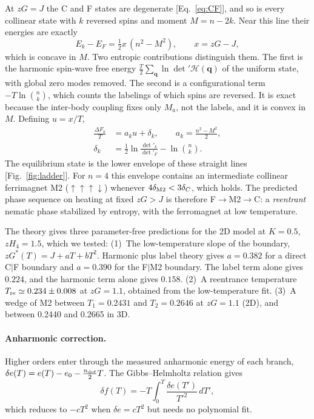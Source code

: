 \documentclass[pre,twocolumn,superscriptaddress,amsmath,amssymb,floatfix]{revtex4-2}
\begin{document}
At $zG=J$ the C and F states are degenerate [Eq.~\eqref{eq:CF}], and so is every collinear state with $k$ reversed spins and moment $M=n-2k$. Near this line their energies are exactly
\begin{equation}
E_k-E_F=\tfrac12 x\,(n^2-M^2),\qquad x=zG-J,
\end{equation}
which is concave in $M$. Two entropic contributions distinguish them. The first is the harmonic spin-wave free energy $\tfrac{T}{2}\sum_{\mathbf q}\ln\det{}'\mathcal{H}(\mathbf q)$ of the uniform state, with global zero modes removed. The second is a configurational term $-T\ln\binom{n}{k}$, which counts the labelings of which spins are reversed. It is exact because the inter-body coupling fixes only $M_a$, not the labels, and it is convex in $M$. Defining $u=x/T$,
\begin{align}
\frac{\Delta F_k}{T}&=a_ku+\delta_k,\qquad a_k=\frac{n^2-M^2}{2},\label{eq:ladder}\\
\delta_k&=\tfrac12\ln\frac{\det{}'_k}{\det{}'_F}-\ln\binom{n}{k}.\nonumber
\end{align}
The equilibrium state is the lower envelope of these straight lines [Fig.~\ref{fig:ladder}]. For $n=4$ this envelope contains an intermediate collinear ferrimagnet M2 ($\uparrow\uparrow\uparrow\downarrow$) whenever $4\delta_{\rm M2}<3\delta_C$, which holds. The predicted phase sequence on heating at fixed $zG>J$ is therefore F$\to$M2$\to$C: a \emph{reentrant} nematic phase stabilized by entropy, with the ferromagnet at low temperature.



The theory gives three parameter-free predictions for the 2D model at $K=0.5$, $zH_4=1.5$, which we tested:
(1)~The low-temperature slope of the boundary, $zG^*(T)=J+aT+bT^2$. Harmonic plus label theory gives $a=0.382$ for a direct C$|$F boundary and $a=0.390$ for the F$|$M2 boundary. The label term alone gives $0.224$, and the harmonic term alone gives $0.158$.
(2)~A reentrance temperature $T_{\rm re}\simeq0.234\pm0.008$ at $zG=1.1$, obtained from the low-temperature fit.
(3)~A wedge of M2 between $T_1=0.2431$ and $T_2=0.2646$ at $zG=1.1$ (2D), and between 0.2440 and 0.2665 in 3D.

\paragraph*{Anharmonic correction.} Higher orders enter through the measured anharmonic energy of each branch, $\delta e(T)=e(T)-e_0-\tfrac{n_{\rm dof}}{2}T$. The Gibbs--Helmholtz relation gives
\begin{equation}
\delta f(T)=-T\int_0^T\frac{\delta e(T')}{T'^2}\,dT',
\label{eq:TI}
\end{equation}
which reduces to $-cT^2$ when $\delta e=cT^2$ but needs no polynomial fit.
\end{document}
